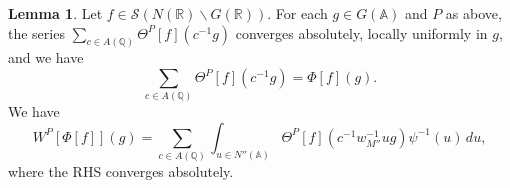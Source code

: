 \documentclass[reqno]{amsart}
\theoremstyle{plain} \newtheorem{theorem} {Theorem}
\theoremstyle{definition} \newtheorem{definition} [theorem] {Definition}
\theoremstyle{itplain} %
\newtheorem{lemma}[theorem]{Lemma}
\numberwithin{equation}{section}
\numberwithin{theorem}{section}
\begin{document}
\begin{lemma}\label{lem:sub-gln:each-g-in}
  Let $f \in \mathcal{S}(N(\mathbb{R}) \backslash G(\mathbb{R}))$.  For each $g \in G(\mathbb{A})$ and $P$ as above, the series $\sum _{c \in A(\mathbb{Q}) } \Theta^P[f](c^{-1} g)$ converges absolutely, locally uniformly in $g$, and we have
  \begin{equation}\label{eq:sum-_c-in-1}
    \sum _{c \in A(\mathbb{Q}) } \Theta^P[f](c^{-1} g) = \Phi[f](g).
  \end{equation}
  We have
  \begin{equation}\label{eq:wpphif_inftyg-=-sum}
    W^P[\Phi[f]](g) = \sum _{c \in A(\mathbb{Q})}
    \int _{u \in N''(\mathbb{A})}
    \Theta^P[f]
    (
    c^{-1} w_{M''}^{-1} u g
    )
    \psi^{-1}(u) \, d u,
  \end{equation}
  where the RHS converges absolutely.
\end{lemma}
\end{document}
